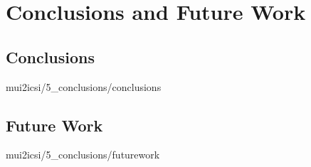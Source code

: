 \documentclass[english,epsbased,copyright,final,printable,covers,extendedindex,firstnumbered,tfm,gnuplot,loc,loe,lof,lot]{tfgtfmthesisuam}
\begin{document}
  \chapter{Conclusions and Future Work\label{CAP:CONCLUSIONS}}
    \section{Conclusions\label{SEC:CONCLUSIONS}}{mui2icsi/5_conclusions/conclusions}

    \section{Future Work\label{SEC:FUTUREWORK}}{mui2icsi/5_conclusions/futurework}

  \appendix
\end{document}

